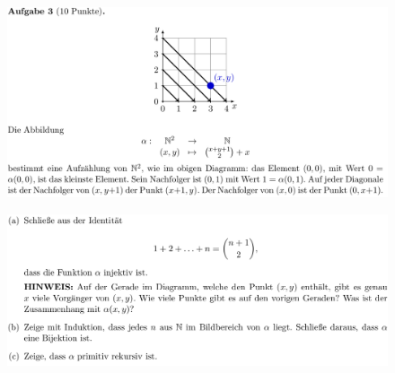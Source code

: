\documentclass[a4paper]{scrartcl}%
\begin{document}

\newpage

\section*{}%
\label{sec:aufgabe_3}

    \begin{figure}[H]
        \includegraphics[scale=0.3]{./A-3.png}
        \label{fig:}
    \end{figure}

    \begin{figure}[H]
        \includegraphics[scale=0.3]{./A-3-2.png}
        \label{fig:}
    \end{figure}
\end{document}

